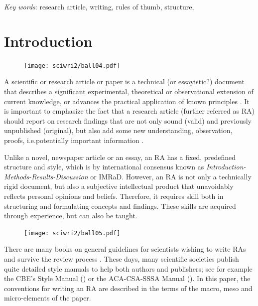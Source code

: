 \documentclass[graybox,envcountchap,sectrefs,UStrade]{svmono}
\begin{document}
\begin{flushleft}
\emph{Key words}: research article, writing, rules of thumb, structure,
\end{flushleft}


\section*{Introduction}

\begin{figure}
 \vspace{-20pt}
\texttt{[image: sciwri2/ball04.pdf]}
 \vspace{-20pt}
\end{figure}
A scientific or research article or paper is a technical (or essayistic?) document that describes a significant experimental, theoretical or observational extension of current knowledge, or advances the practical application of known principles \citep{oConnor1975writing}. It is important to emphasize the fact that a research article (further referred as RA) should report on research findings that are not only sound (valid) and previously unpublished (original), but also add some new understanding, observation, proofs, i.e.\@ potentially important information \citep{gordon1983running}. \par

Unlike a novel, newspaper article or an essay, an RA has a fixed, predefined structure and style, which is by international consensus known as \emph{Introduction-Methods-Results-Discussion} or IMRaD. However, an RA is not only a technically rigid document, but also a subjective intellectual product that unavoidably reflects personal opinions and beliefs. Therefore, it requires skill both in structuring and formulating concepts and findings. These skills are acquired through experience, but can also be taught.\par

\begin{figure}
\vspace{-20pt}
\texttt{[image: sciwri2/ball05.pdf]}
\vspace{-20pt}
\end{figure}
There are many books on general guidelines for scientists wishing to write RAs and survive the review process \citep{trelease1969write,day2006write,germano2008getting}. These days, many scientific societies publish quite detailed style manuals to help both authors and publishers; see for example the CBE's Style Manual (\citeyear{cbe1994scientific}) or the ACA-CSA-SSSA Manual (\citeyear{ASA-CSA-SSSA1998}). In this paper, the conventions for writing an RA are described in the terms of the macro, meso and micro-elements of the paper.\par
\end{document}
